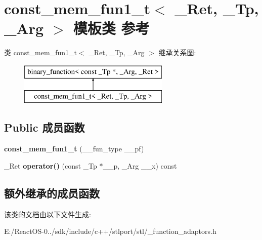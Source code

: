 \hypertarget{classconst__mem__fun1__t}{}\section{const\+\_\+mem\+\_\+fun1\+\_\+t$<$ \+\_\+\+Ret, \+\_\+\+Tp, \+\_\+\+Arg $>$ 模板类 参考}
\label{classconst__mem__fun1__t}
类 const\+\_\+mem\+\_\+fun1\+\_\+t$<$ \+\_\+\+Ret, \+\_\+\+Tp, \+\_\+\+Arg $>$ 继承关系图\+:\begin{figure}[H]
\begin{center}
\leavevmode
\includegraphics[height=2.000000cm]{classconst__mem__fun1__t}
\end{center}
\end{figure}
\subsection*{Public 成员函数}
\begin{DoxyCompactItemize}
\item 
\mbox{\label{classconst__mem__fun1__t_a29c8d76ee0218efdd7e16b9f1d0572be}} 
{\bfseries const\+\_\+mem\+\_\+fun1\+\_\+t} (\+\_\+\+\_\+fun\+\_\+type \+\_\+\+\_\+pf)
\item 
\mbox{\label{classconst__mem__fun1__t_a1710904521b0ebc9703f8a63c9506c14}} 
\+\_\+\+Ret {\bfseries operator()} (const \+\_\+\+Tp $\ast$\+\_\+\+\_\+p, \+\_\+\+Arg \+\_\+\+\_\+x) const
\end{DoxyCompactItemize}
\subsection*{额外继承的成员函数}


该类的文档由以下文件生成\+:\begin{DoxyCompactItemize}
\item 
E\+:/\+React\+O\+S-\/0../sdk/include/c++/stlport/stl/\+\_\+function\+\_\+adaptors.\+h\end{DoxyCompactItemize}
